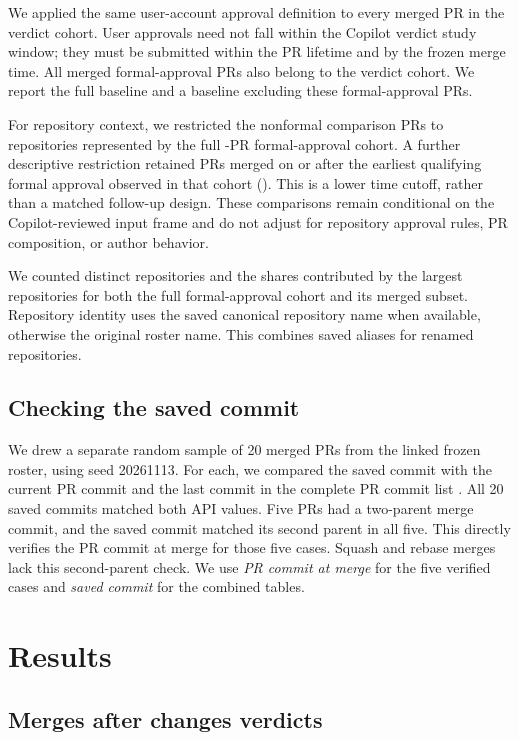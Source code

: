 \documentclass[11pt,letterpaper]{article}
\begin{document}
We applied the same user-account approval definition to every merged PR
in the verdict cohort. User approvals need not fall within the
Copilot verdict study window; they must be submitted within the PR
lifetime and by the frozen merge time. All \FormalMerged{} merged
formal-approval PRs also belong to the verdict cohort. We report
the full baseline and a baseline excluding these formal-approval PRs.

For repository context, we restricted the nonformal comparison PRs to
repositories represented by the full \FormalPRs{}-PR formal-approval
cohort. A further descriptive restriction retained PRs merged on or after
the earliest qualifying formal approval observed in that cohort
(\FirstFormalDate{}). This is a lower time cutoff, rather than a matched
follow-up design. These comparisons remain conditional on the
Copilot-reviewed input frame and do not adjust for repository approval
rules, PR composition, or author behavior.

We counted distinct repositories and the shares contributed by the
largest repositories for both the full formal-approval cohort and its
merged subset. Repository identity uses the saved canonical repository
name when available, otherwise the original roster name. This combines
saved aliases for renamed repositories.

\subsection{Checking the saved commit}

We drew a separate random sample of 20 merged PRs from the linked frozen
roster, using seed 20261113. For each, we compared the saved commit with
the current PR commit and the last commit in the complete PR commit list
\cite{github_commits}. All 20 saved commits matched both API values.
Five PRs had a two-parent merge commit, and the saved commit matched its
second parent in all five. This directly verifies the PR commit at merge for
those five cases. Squash and rebase merges lack this second-parent check.
We use \emph{PR commit at merge} for the five verified cases and \emph{saved commit}
for the combined tables.

\section{Results}

\subsection{Merges after changes verdicts}
\end{document}
